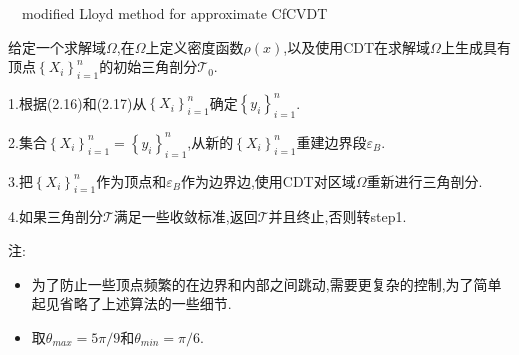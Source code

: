 \documentclass[9pt, a4paper,eqno]{article}
\theoremstyle{plain}
\begin{document}
\begin{CJK}{UTF8}{gkai}
\begin{algorithm}
 \caption{~~modified Lloyd method for approximate CfCVDT}
给定一个求解域$\Omega$,在$\Omega$上定义密度函数$\rho(x)$,以及使用CDT在求解域$\Omega$上生成具有顶点$\left\lbrace X_i \right\rbrace_{i=1}^{n}$的初始三角剖分$\mathcal{T}_0$.

1.根据(2.16)和(2.17)从$\left\lbrace X_i \right\rbrace_{i=1}^{n}$确定$\left\lbrace y_i \right\rbrace_{i=1}^{n}$.

2.集合$\left\lbrace X_i \right\rbrace_{i=1}^{n} = \left\lbrace y_i \right\rbrace_{i=1}^{n}$,从新的$\left\lbrace X_i \right\rbrace_{i=1}^{n}$重建边界段$\varepsilon _B$.

3.把$\left\lbrace X_i  \right\rbrace_{i=1}^{n}$作为顶点和$\varepsilon_B$作为边界边,使用CDT对区域$\Omega$重新进行三角剖分.

4.如果三角剖分$\mathcal{T}$满足一些收敛标准,返回$\mathcal{T}$并且终止,否则转step1.
\end{algorithm}

注:
\begin{itemize}
\item 为了防止一些顶点频繁的在边界和内部之间跳动,需要更复杂的控制,为了简单起见省略了上述算法的一些细节.
\item 取$\theta_{max}=5\pi/9$和$\theta_{min}=\pi/6.$
\end{itemize}





\end{CJK}
\end{document}
